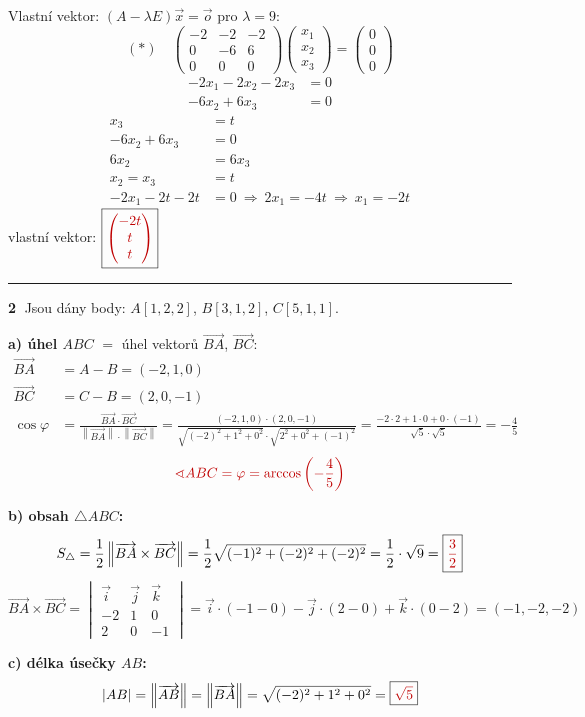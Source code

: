 \documentclass[10pt,a4paper]{article}
\newcommand{\vysl}[1]{\boxed{\color{red!75!black}#1}}
\newcommand{\pozn}[1]{{\color{red!75!black}#1}}
\newcommand{\vv}[1]{\overrightarrow{#1}}
\newcommand{\norm}[1]{\left\|#1\right\|}
\begin{document}
{\color{blue!60!black}Vlastní vektor: $(A-\lambda E)\vec x=\vec o$ pro $\lambda=9$:}
\[
(*)\quad
\begin{pmatrix} -2 & -2 & -2\\ 0 & -6 & 6\\ 0 & 0 & 0 \end{pmatrix}
\begin{pmatrix} x_1\\ x_2\\ x_3 \end{pmatrix} = \begin{pmatrix} 0\\ 0\\ 0 \end{pmatrix}
\]
\begin{align*}
-2x_1-2x_2-2x_3 &= 0\\
-6x_2+6x_3 &= 0
\end{align*}
\begin{align*}
x_3 &= t\\
-6x_2+6x_3 &= 0\\
6x_2 &= 6x_3\\
x_2 = x_3 &= t\\
-2x_1-2t-2t &= 0 \ \Rightarrow\ 2x_1=-4t \ \Rightarrow\ x_1=-2t
\end{align*}
\pozn{vlastní vektor:} \quad $\vysl{\begin{pmatrix} -2t\\ t\\ t \end{pmatrix}}$

\bigskip
\hrule
\medskip

\textbf{\textcircled{2}} Jsou dány body: $A[1,2,2]$, $B[3,1,2]$, $C[5,1,1]$.

\textbf{\pozn{a) úhel $ABC$}} $=$ úhel vektorů $\vv{BA}$, $\vv{BC}$:
\begin{align*}
\vv{BA} &= A-B = (-2,1,0)\\
\vv{BC} &= C-B = (2,0,-1)\\
\cos\varphi &= \frac{\vv{BA}\cdot\vv{BC}}{\norm{\vv{BA}}\cdot\norm{\vv{BC}}}
= \frac{(-2,1,0)\cdot(2,0,-1)}{\sqrt{(-2)^2+1^2+0^2}\cdot\sqrt{2^2+0^2+(-1)^2}}
= \frac{-2\cdot2+1\cdot0+0\cdot(-1)}{\sqrt5\cdot\sqrt5} = -\frac45
\end{align*}
\[
\pozn{\sphericalangle ABC=\varphi=\arccos\left(-\frac45\right)}
\]

\textbf{\pozn{b) obsah $\triangle ABC$:}}
\[
S_\triangle = \frac12\norm{\vv{BA}\times\vv{BC}} = \frac12\sqrt{(-1)^2+(-2)^2+(-2)^2} = \frac12\cdot\sqrt9 = \vysl{\frac32}
\]
\[
\vv{BA}\times\vv{BC} = \begin{vmatrix} \vec i & \vec j & \vec k\\ -2 & 1 & 0\\ 2 & 0 & -1 \end{vmatrix}
= \vec i\cdot(-1-0)-\vec j\cdot(2-0)+\vec k\cdot(0-2) = (-1,-2,-2)
\]

\textbf{\pozn{c) délka úsečky $AB$:}}
\[
|AB| = \norm{\vv{AB}} = \norm{\vv{BA}} = \sqrt{(-2)^2+1^2+0^2} = \vysl{\sqrt5}
\]
\end{document}

